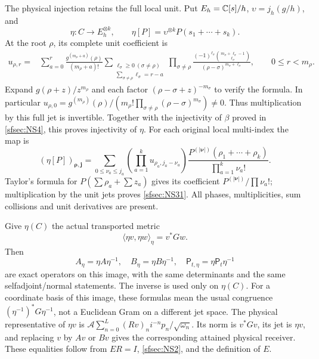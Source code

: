 \documentclass[11pt]{article}
\begin{document}
The physical injection retains the full local unit.
Put $E_h=\mathbb C[s]/h$, $\upsilon=j_h(g/h)$, and
\begin{equation}\tag{NS29}\label{sfsec:NS29}
\eta:C\longrightarrow E_h^{\otimes k},\qquad
\eta[P]=\upsilon^{\otimes k}P(s_1+\cdots+s_k).
\end{equation}
At the root $\rho$, its complete unit coefficient is
\begin{equation}\tag{NS30}\label{sfsec:NS30}
\begin{split}
u_{\rho,r}
={}&\sum_{a=0}^r
\frac{g^{(m_\rho+a)}(\rho)}{(m_\rho+a)!}
\sum_{\substack{\ell_\sigma\geq0\ (\sigma\ne\rho)\\
                 \sum_{\sigma\ne\rho}\ell_\sigma=r-a}}
\prod_{\sigma\ne\rho}
\frac{(-1)^{\ell_\sigma}
 \binom{m_\sigma+\ell_\sigma-1}{\ell_\sigma}}
 {(\rho-\sigma)^{m_\sigma+\ell_\sigma}},
\qquad 0\leq r<m_\rho .
\end{split}
\end{equation}
Expand $g(\rho+z)/z^{m_\rho}$ and each factor
$(\rho-\sigma+z)^{-m_\sigma}$ to verify the formula.
In particular
$u_{\rho,0}=g^{(m_\rho)}(\rho)/
(m_\rho!\prod_{\sigma\ne\rho}(\rho-\sigma)^{m_\sigma})\ne0$.
Thus multiplication by this full jet is invertible.
Together with the injectivity of $\beta$ proved in
\eqref{sfsec:NS4}, this proves injectivity of $\eta$.
For each original local multi-index the map is
\begin{equation}\tag{NS31}\label{sfsec:NS31}
(\eta[P])_{\boldsymbol\rho,\boldsymbol j}
=\sum_{0\leq\nu_a\leq j_a}
 \left(\prod_{a=1}^k u_{\rho_a,j_a-\nu_a}\right)
 \frac{P^{(|\boldsymbol\nu|)}(\rho_1+\cdots+\rho_k)}
      {\prod_{a=1}^k\nu_a!}.
\end{equation}
Taylor's formula for $P(\sum\rho_a+\sum z_a)$ gives its
coefficient $P^{(|\boldsymbol\nu|)}/\prod\nu_a!$;
multiplication by the unit jets proves \eqref{sfsec:NS31}.
All phases, multiplicities, sum collisions and unit
derivatives are present.

Give $\eta(C)$ the actual transported metric
\[
\langle\eta v,\eta w\rangle_\eta=v^*Gw.
\]
Then
\begin{equation}\tag{NS32}\label{sfsec:NS32}
A_\eta=\eta A\eta^{-1},\quad
B_\eta=\eta B\eta^{-1},\quad
\mathsf P_{t,\eta}=\eta\mathsf P_t\eta^{-1}
\end{equation}
are exact operators on this image, with the same
determinants and the same selfadjoint/normal statements.
The inverse is used only on $\eta(C)$.
For a coordinate basis of this image, these formulas
mean the usual congruence $(\eta^{-1})^*G\eta^{-1}$,
not a Euclidean Gram on a different jet space.
The physical representative of $\eta v$ is
$\mathcal A\sum_{n=0}^L (Rv)_n i^{-n}p_n/\sqrt{\omega_n}$.
Its norm is $v^*Gv$, its jet is $\eta v$, and replacing
$v$ by $Av$ or $Bv$ gives the corresponding attained
physical receiver. These equalities follow from
$ER=I$, \eqref{sfsec:NS2}, and the definition of $E$.
\end{document}
